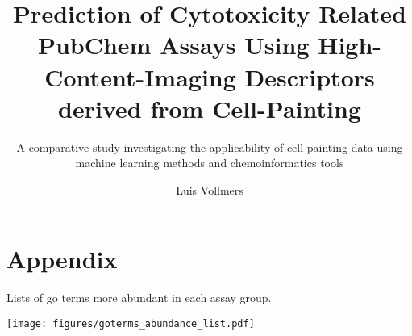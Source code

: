 \documentclass[
	ngerman,
	ruledheaders=section,%
	class=report,%
	thesis={type=master},%
	accentcolor=1c,%
	custommargins=geometry,%
	marginpar=false,%
	parskip=half-,%
	fontsize=11pt,%
]{tudapub}
\begin{document}
	
	\title{Prediction of Cytotoxicity Related PubChem Assays Using High-Content-Imaging Descriptors derived from Cell-Painting}
	\subtitle{A comparative study investigating the applicability of cell-painting data using machine learning methods and chemoinformatics tools}
	\author[L. Vollmers]{Luis Vollmers}
	

	
	\submissiondate{\today}
	\examdate{\today}
	
	\maketitle
	
	\affidavit%
	\tableofcontents
	
	
	
	
	
	
	
	
	
	

	

	\printacronyms[
	name = {Abbreviations}
	,sort = true
	,display = used
	,exclude=noprint]
	
	
	
	
	\chapter{Appendix}
	\newpage
	\vspace{-5cm}
	\begin{table}[H]
		\centering
		\caption[Lists of \ac{go} Terms More Abundant in Each Assay Group.]{Lists of \ac{go} terms more abundant in each assay group.}
		\label{tab:goterms}
		\texttt{[image: figures/goterms\_abundance\_list.pdf]}
	\end{table}
\newpage
\listoffigures
\listoftables
\end{document}

